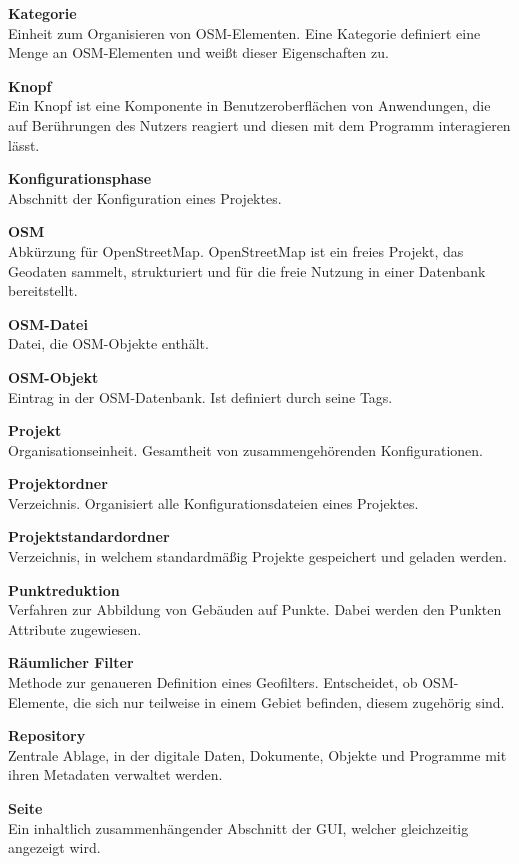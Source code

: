 \documentclass[parskip=full]{scrartcl} %
\begin{document}
\textbf{Kategorie}\\
Einheit zum Organisieren von OSM-Elementen. Eine Kategorie definiert eine Menge an OSM-Elementen und weißt dieser Eigenschaften zu.

\textbf{Knopf}\\
Ein Knopf ist eine Komponente in Benutzeroberflächen von Anwendungen, die auf Berührungen des Nutzers reagiert und diesen mit dem Programm interagieren lässt.

\textbf{Konfigurationsphase}\\
Abschnitt der Konfiguration eines Projektes.

\textbf{OSM}\\
Abkürzung für OpenStreetMap. OpenStreetMap ist ein freies Projekt, das Geodaten sammelt, strukturiert und für die freie Nutzung in einer Datenbank bereitstellt.

\textbf{OSM-Datei}\\
Datei, die OSM-Objekte enthält.

\textbf{OSM-Objekt}\\
Eintrag in der OSM-Datenbank. Ist definiert durch seine Tags.

\textbf{Projekt}\\
Organisationseinheit. Gesamtheit von zusammengehörenden Konfigurationen.

\textbf{Projektordner}\\
Verzeichnis. Organisiert alle Konfigurationsdateien eines Projektes.

\textbf{Projektstandardordner}\\
Verzeichnis, in welchem standardmäßig Projekte gespeichert und geladen werden.

\textbf{Punktreduktion}\\
Verfahren zur Abbildung von Gebäuden auf Punkte. Dabei werden den Punkten Attribute zugewiesen.

\textbf{Räumlicher Filter}\\
Methode zur genaueren Definition eines Geofilters. Entscheidet, ob OSM-Elemente, die sich nur teilweise in einem Gebiet befinden, diesem zugehörig sind.

\textbf{Repository}\\
Zentrale Ablage, in der digitale Daten, Dokumente, Objekte und Programme mit ihren Metadaten verwaltet werden.

\textbf{Seite}\\
Ein inhaltlich zusammenhängender Abschnitt der GUI, welcher gleichzeitig angezeigt wird.
\end{document}
